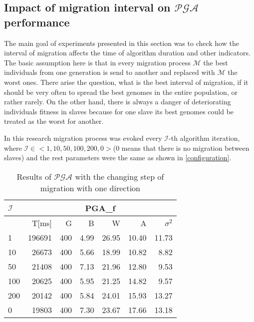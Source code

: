 \subsection{Impact of migration interval on $\mathcal{PGA}$ performance}
The main goal of experiments presented in this section was to check how the
interval of migration affects the time of algorithm duration and other
indicators. The basic assumption here is that in every migration process
$\mathcal{M}$ the best individuals from one 
generation is send to another and replaced with $\mathcal{M}$ the worst ones. 
There arise the question, what is the best interval of migration, if it should
be very often to spread the best
genomes in the entire population, or rather rarely. On the other hand, there is always a danger
of deteriorating individuals fitness in slaves because for one slave its best
genomes could be treated as the worst for another. 

In this research migration process was evoked every $\mathcal{I}$-th algorithm
iteration, where $\mathcal{I} \in <1, 10 , 50 , 100, 200, 0>$(0 means that
there is no migration between slaves) and the rest parameters were the same as shown in
\ref{configuration}. 
\begin{table}[!htpb]
	\label{pga1step}
	\caption{Results of $\mathcal{PGA}$ with the changing
	step of migration with one direction}
	\centering
	\begin{tabular}{l||r|r|r|r|r|r|}
        $\mathcal{I}$ & \multicolumn{6}{c|}{PGA\_f} \\ \hline
		          &T[ms]&G& B&W&A&$\sigma^2$ \\ \hline
		1&196691&400&4.99&26.95&10.40&11.73\\ \hline
		10&26673&400&5.66&18.99&10.82&8.82\\ \hline
		50&21408&400&7.13&21.96&12.80&9.53\\ \hline
		100&20625&400&5.95&21.25&14.82&9.57\\ \hline
		200&20142&400&5.84&24.01&15.93&13.27\\ \hline
		0&19803&400&7.30&23.67&17.66&13.18\\ \hline
	\end{tabular}
\end{table}

